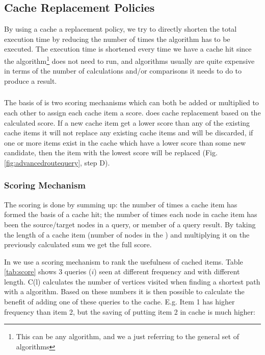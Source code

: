 \subsection{Cache Replacement Policies}

By using a cache a replacement policy, we try to directly shorten the total execution time by reducing the number of times the \spath algorithm has to be executed. 
The execution time is shortened every time we have a cache hit since the \spath algorithm\footnote{This can be any \spath algorithm, and we a just referring to the general set of \spath algorithms} does not need to run, and \spath algorithms usually are quite expensive in terms of the number of calculations and/or comparisons it needs to do to produce a result.


\subsubsection{\osc}

The basis of \osc is two scoring mechanisms which can both be added or multiplied to each other to assign each cache item a score. \osc does cache replacement based on the calculated score. If a new cache item get a lower score than any of the existing cache items it will not replace any existing cache items and will be discarded, if one or more items exist in the cache which have a lower score than some new candidate, then the item with the lowest score will be replaced (Fig. \ref{fig:advancedroutequery}, step D).



\subsubsection{Scoring Mechanism}


The scoring is done by summing up: the number of times a cache item has formed the basis of a cache hit; the number of times each node in cache item has been the source/target nodes in a query, or member of a query result. By taking the length of a cache item (number of nodes in the \spath) and multiplying it on the previously calculated sum we get the full score.

In \osc we use a scoring mechanism to rank the usefulness of cached items. Table \ref{tab:score} shows 3 queries ($i$) seen at different frequency and with different length. C(l) calculates the number of vertices visited when finding a shortest path with a \spath algorithm. Based on these numbers it is then possible to calculate the benefit of adding one of these \spath queries to the cache. E.g. Item 1 has higher frequency than item 2, but the saving of putting item 2 in cache is much higher:

